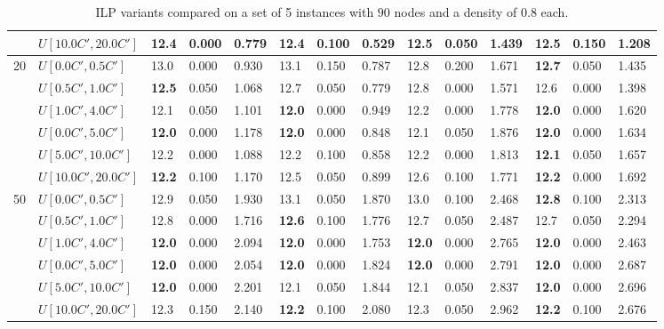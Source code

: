 \begin{table}[h]
{\begin{tabular}{|l|l||l|l|l||l|l|l||l|l|l||l|l|l|}
       & $U[10.0C',20.0C']$ & \textbf{12.4} & 0.000 & 0.779 & \textbf{12.4} & 0.100 & 0.529 & 12.5 & 0.050 & 1.439 & 12.5 & 0.150 & 1.208 \\
      \hline\hline
      \multirow{6}{*}{20} & $U[0.0C',0.5C']$ & 13.0 & 0.000 & 0.930 & 13.1 & 0.150 & 0.787 & 12.8 & 0.200 & 1.671 & \textbf{12.7} & 0.050 & 1.435 \\
       & $U[0.5C',1.0C']$ & \textbf{12.5} & 0.050 & 1.068 & 12.7 & 0.050 & 0.779 & 12.8 & 0.000 & 1.571 & 12.6 & 0.000 & 1.398 \\
       & $U[1.0C',4.0C']$ & 12.1 & 0.050 & 1.101 & \textbf{12.0} & 0.000 & 0.949 & 12.2 & 0.000 & 1.778 & \textbf{12.0} & 0.000 & 1.620 \\
       & $U[0.0C',5.0C']$ & \textbf{12.0} & 0.000 & 1.178 & \textbf{12.0} & 0.000 & 0.848 & 12.1 & 0.050 & 1.876 & \textbf{12.0} & 0.000 & 1.634 \\
       & $U[5.0C',10.0C']$ & 12.2 & 0.000 & 1.088 & 12.2 & 0.100 & 0.858 & 12.2 & 0.000 & 1.813 & \textbf{12.1} & 0.050 & 1.657 \\
       & $U[10.0C',20.0C']$ & \textbf{12.2} & 0.100 & 1.170 & 12.5 & 0.050 & 0.899 & 12.6 & 0.100 & 1.771 & \textbf{12.2} & 0.000 & 1.692 \\
      \hline\hline
      \multirow{6}{*}{50} & $U[0.0C',0.5C']$ & 12.9 & 0.050 & 1.930 & 13.1 & 0.050 & 1.870 & 13.0 & 0.100 & 2.468 & \textbf{12.8} & 0.100 & 2.313 \\
       & $U[0.5C',1.0C']$ & 12.8 & 0.000 & 1.716 & \textbf{12.6} & 0.100 & 1.776 & 12.7 & 0.050 & 2.487 & 12.7 & 0.050 & 2.294 \\
       & $U[1.0C',4.0C']$ & \textbf{12.0} & 0.000 & 2.094 & \textbf{12.0} & 0.000 & 1.753 & \textbf{12.0} & 0.000 & 2.765 & \textbf{12.0} & 0.000 & 2.463 \\
       & $U[0.0C',5.0C']$ & \textbf{12.0} & 0.000 & 2.054 & \textbf{12.0} & 0.000 & 1.824 & \textbf{12.0} & 0.000 & 2.791 & \textbf{12.0} & 0.000 & 2.687 \\
       & $U[5.0C',10.0C']$ & \textbf{12.0} & 0.000 & 2.201 & 12.1 & 0.050 & 1.844 & 12.1 & 0.050 & 2.837 & \textbf{12.0} & 0.000 & 2.696 \\
       & $U[10.0C',20.0C']$ & 12.3 & 0.150 & 2.140 & \textbf{12.2} & 0.100 & 2.080 & 12.3 & 0.050 & 2.962 & \textbf{12.2} & 0.100 & 2.676 \\
      \hline
      \end{tabular}
      }
      \caption{ILP variants compared on a set of 5 instances with $90$ nodes and a density of $0.8$ each.}
      \label{tab:pcpn90p8ILPVariant}\end{table}
      
